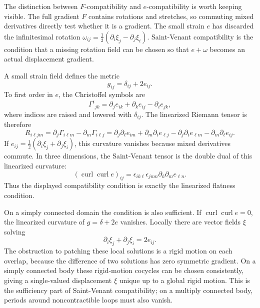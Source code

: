The distinction between \(F\)-compatibility and \(e\)-compatibility is worth
keeping visible.  The full gradient \(F\) contains rotations and stretches, so
commuting mixed derivatives directly test whether it is a gradient.  The small
strain \(e\) has discarded the infinitesimal rotation
\(\omega_{ij}=\frac12(\partial_i\xi_j-\partial_j\xi_i)\).  Saint-Venant
compatibility is the condition that a missing rotation field can be chosen so
that \(e+\omega\) becomes an actual displacement gradient.

\begin{derivation}
A small strain field defines the metric
\[
  g_{ij}=\delta_{ij}+2e_{ij}.
\]
To first order in \(e\), the Christoffel symbols are
\[
  \Gamma^i{}_{jk}
  =
  \partial_j e_{ik}+\partial_k e_{ij}-\partial_i e_{jk},
\]
where indices are raised and lowered with \(\delta_{ij}\). The linearized
Riemann tensor is therefore
\[
  R_{i\ell jm}
  =
  \partial_j\Gamma_{i\ell m}-\partial_m\Gamma_{i\ell j}
  =
  \partial_j\partial_\ell e_{im}
  +\partial_m\partial_i e_{\ell j}
  -\partial_j\partial_i e_{\ell m}
  -\partial_m\partial_\ell e_{ij}.
\]
If \(e_{ij}=\frac12(\partial_i\xi_j+\partial_j\xi_i)\), this curvature
vanishes because mixed derivatives commute. In three dimensions, the
Saint-Venant tensor is the double dual of this linearized curvature:
\[
  (\operatorname{curl}\operatorname{curl}e)_{ij}
  =
  \epsilon_{ik\ell}\epsilon_{jmn}\partial_k\partial_m e_{\ell n}.
\]
Thus the displayed compatibility condition is exactly the linearized flatness
condition.
\end{derivation}

On a simply connected domain the condition is also sufficient. If
\(\operatorname{curl}\operatorname{curl}e=0\), the linearized curvature of
\(g=\delta+2e\) vanishes. Locally there are vector fields \(\xi\) solving
\[
  \partial_i\xi_j+\partial_j\xi_i=2e_{ij}.
\]
The obstruction to patching these local solutions is a rigid motion on each
overlap, because the difference of two solutions has zero symmetric gradient.
On a simply connected body these rigid-motion cocycles can be chosen
consistently, giving a single-valued displacement \(\xi\) unique up to a global
rigid motion. This is the sufficiency part of Saint-Venant compatibility; on a
multiply connected body, periods around noncontractible loops must also vanish.

